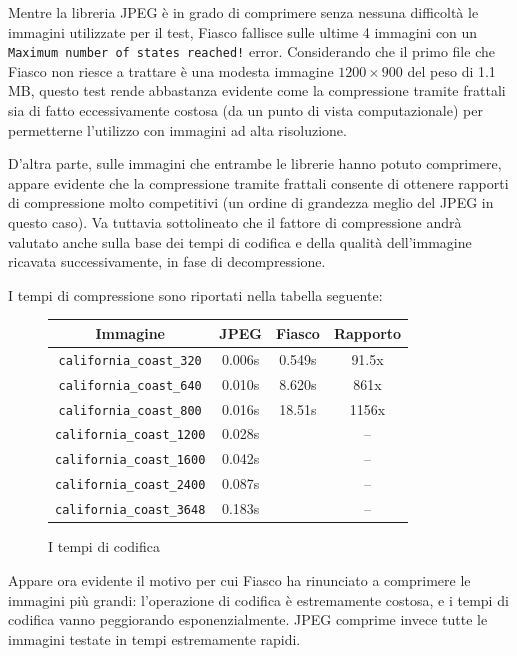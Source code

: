 \documentclass[11pt,a4paper,appendixprefix=true,numbers=noenddot]{scrreprt}
\newcommand{\nope}{\ding{55}}%
\begin{document}
Mentre la libreria JPEG è in grado di comprimere senza nessuna difficoltà le immagini utilizzate per il test, Fiasco fallisce sulle ultime 4 immagini con un \texttt{Maximum number of states reached!} error. Considerando che il primo file che Fiasco non riesce a trattare è una modesta immagine $1200 \times 900$ del peso di 1.1 MB, questo test rende abbastanza evidente come la compressione tramite frattali sia di fatto eccessivamente costosa (da un punto di vista computazionale) per permetterne l'utilizzo con immagini ad alta risoluzione. 

D'altra parte, sulle immagini che entrambe le librerie hanno potuto comprimere, appare evidente che la compressione tramite frattali consente di ottenere rapporti di compressione molto competitivi (un ordine di grandezza meglio del JPEG in questo caso). Va tuttavia sottolineato che il fattore di compressione andrà valutato anche sulla base dei tempi di codifica e della qualità dell'immagine ricavata successivamente, in fase di decompressione.

I tempi di compressione sono riportati nella tabella seguente:

\begin{figure}[!ht]
\centering
\begin{tabular}{c||cc|c}
Immagine & JPEG & Fiasco & Rapporto \\ 
\hline 
\texttt{california\_coast\_320} & 0.006s & 0.549s & 91.5x\\ 
\hline 
\texttt{california\_coast\_640} & 0.010s & 8.620s & 861x \\
\hline 
\texttt{california\_coast\_800} & 0.016s & 18.51s & 1156x \\
\hline 
\texttt{california\_coast\_1200} & 0.028s & \nope & -- \\
\hline 
\texttt{california\_coast\_1600} & 0.042s & \nope & -- \\
\hline
\texttt{california\_coast\_2400} & 0.087s & \nope & -- \\
\hline 
\texttt{california\_coast\_3648} & 0.183s & \nope & -- \\
\end{tabular} 
\caption{I tempi di codifica}
\end{figure}

Appare ora evidente il motivo per cui Fiasco ha rinunciato a comprimere le immagini più grandi: l'operazione di codifica è estremamente costosa, e i tempi di codifica vanno peggiorando esponenzialmente. JPEG comprime invece tutte le immagini testate in tempi estremamente rapidi.
\end{document}
